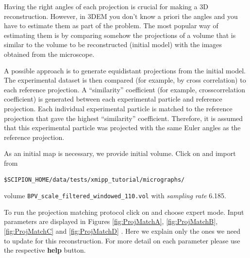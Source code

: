 \documentclass[12pt]{article} %
\newcommand{\comm}[1]{\texttt{#1}}
\begin{document}
Having the right angles of each projection is crucial for making a 3D
reconstruction.  However, in 3DEM you don’t know a priori the angles
and you have to estimate them as part of the problem. The most popular
way of estimating them is by comparing somehow the projections of a
volume that is similar to the volume to be reconstructed (initial
model) with the images obtained from the microscope.

A possible approach is to generate equidistant projections from the
initial model. The experimental dataset is then compared (for
example, by cross correlation) to each reference projection.  A
“similarity” coefficient (for example, crosscorrelation coefficient)
is generated between each experimental particle and reference
projection. Each individual experimental particle is matched to the
reference projection that gave the highest “similarity”
coefficient. Therefore, it is assumed that this experimental particle
was projected with the same Euler angles as the reference projection.

As an initial map is necessary, we provide initial volume. Click on 
 and import from




\begin{verbatim}
$SCIPION_HOME/data/tests/xmipp_tutorial/micrographs/
\end{verbatim}

\noindent volume \comm{BPV\_scale\_filtered\_windowed\_110.vol} with \textit{sampling rate} 6.185.

To run the projection matching protocol click on
 and choose expert mode.
Input parameters are displayed in Figures \ref{fig:ProjMatchA}, \ref{fig:ProjMatchB},
\ref{fig:ProjMatchC} and \ref{fig:ProjMatchD} . Here we explain only the ones we need to update
for this reconstruction. For more detail on each parameter please use the respective 
\textbf{help} button.
\end{document}
